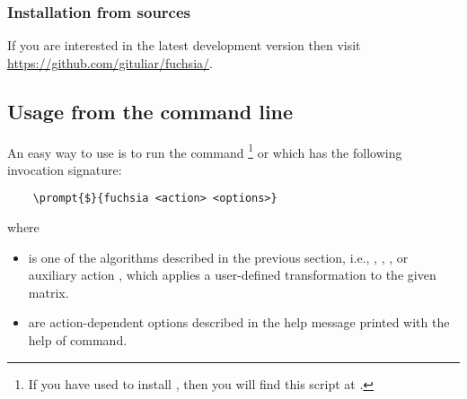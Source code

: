 \documentclass[12pt,a4paper]{article}
\begin{document}
\subsubsection{Installation from sources}

If you are interested in the latest development version then visit \url{https://github.com/gituliar/fuchsia/}.


\subsection{Usage from the command line}

An easy way to use \fuchsia is to run the command \footnote{If you have used  to install \fuchsia, then you will find this script at .} or  which has the following invocation signature:

\begin{Verbatim}
    \prompt{$}{fuchsia <action> <options>}
\end{Verbatim}

where
\begin{itemize}
  \item {} is one of the algorithms described in the previous section, i.e., , , , or auxiliary action , which applies a user-defined transformation to the given matrix.
  \item {} are action-dependent options described in the help message printed with the help of  command.
\end{itemize}
\end{document}
